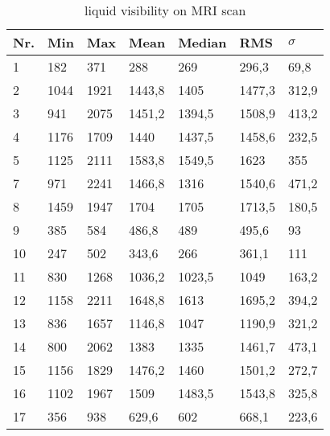 \begin{table}[]
\centering
\begin{tabular}{@{}lllllll@{}}
\toprule
Nr. & Min  & Max  & Mean   & Median & RMS    & $\sigma$   \\ \midrule
1   & 182  & 371  & 288    & 269    & 296,3  & 69,8   \\
2   & 1044 & 1921 & 1443,8 & 1405   & 1477,3 & 312,9  \\
3   & 941  & 2075 & 1451,2 & 1394,5 & 1508,9 & 413,2  \\
4   & 1176 & 1709 & 1440   & 1437,5 & 1458,6 & 232,5  \\
5   & 1125 & 2111 & 1583,8 & 1549,5 & 1623   & 355    \\
7   & 971  & 2241 & 1466,8 & 1316   & 1540,6 & 471,2  \\
8   & 1459 & 1947 & 1704   & 1705   & 1713,5 & 180,5  \\
9   & 385  & 584  & 486,8  & 489    & 495,6  & 93     \\
10  & 247  & 502  & 343,6  & 266    & 361,1  & 111    \\
11  & 830  & 1268 & 1036,2 & 1023,5 & 1049   & 163,2  \\
12  & 1158 & 2211 & 1648,8 & 1613   & 1695,2 & 394,2  \\
13  & 836  & 1657 & 1146,8 & 1047   & 1190,9 & 321,2  \\
14  & 800  & 2062 & 1383   & 1335   & 1461,7 & 473,1  \\
15  & 1156 & 1829 & 1476,2 & 1460   & 1501,2 & 272,7  \\
16  & 1102 & 1967 & 1509   & 1483,5 & 1543,8 & 325,8  \\
17  & 356  & 938  & 629,6  & 602    & 668,1  & 223,6  \\ \bottomrule
\end{tabular}
\caption{liquid visibility on MRI scan}
\label{tab:visibility}
\end{table}

